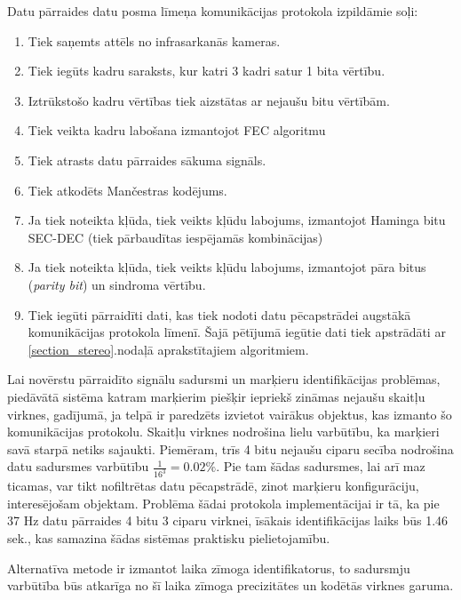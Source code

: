 \documentclass[12pt, a4paper, oneside, openright]{article}
\begin{document}
\par
Datu pārraides datu posma līmeņa komunikācijas protokola izpildāmie soļi:
\begin{enumerate}

\item Tiek saņemts attēls no infrasarkanās kameras.
\item Tiek iegūts kadru saraksts, kur katri 3 kadri satur 1 bita vērtību.
\item Iztrūkstošo kadru vērtības tiek aizstātas ar nejaušu bitu vērtībām.
\item Tiek veikta kadru labošana izmantojot FEC algoritmu
\item Tiek atrasts datu pārraides sākuma signāls.
\item Tiek atkodēts Mančestras kodējums.
\item Ja tiek noteikta kļūda, tiek veikts kļūdu labojums, izmantojot Haminga bitu SEC-DEC (tiek pārbaudītas iespējamās kombinācijas)
\item Ja tiek noteikta kļūda, tiek veikts kļūdu labojums, izmantojot pāra bitus (\textit{parity bit}) un sindroma vērtību.
\item Tiek iegūti pārraidīti dati, kas tiek nodoti datu pēcapstrādei augstākā komunikācijas protokola līmenī. Šajā pētījumā iegūtie dati tiek apstrādāti ar \ref{section_stereo}.nodaļā aprakstītajiem algoritmiem.

\end{enumerate} 

\par
Lai novērstu pārraidīto signālu sadursmi un marķieru identifikācijas problēmas, piedāvātā
sistēma katram marķierim piešķir iepriekš zināmas nejaušu skaitļu virknes, gadījumā, ja
telpā ir paredzēts izvietot vairākus objektus, kas izmanto šo komunikācijas protokolu.
Skaitļu virknes nodrošina lielu varbūtību, ka marķieri savā starpā netiks sajaukti.
Piemēram, trīs 4 bitu nejaušu ciparu secība nodrošina datu sadursmes varbūtību $\frac{1}{16^3} = 0.02\%$.
Pie tam šādas sadursmes, lai arī maz ticamas, var tikt nofiltrētas datu pēcapstrādē,
zinot marķieru konfigurāciju, interesējošam objektam. Problēma šādai protokola implementācijai
ir tā, ka pie 37 Hz datu pārraides 4 bitu 3 ciparu virknei, īsākais identifikācijas laiks būs 1.46 sek.,
kas samazina šādas sistēmas praktisku pielietojamību.

\par
Alternatīva metode ir izmantot laika zīmoga identifikatorus, to sadursmju varbūtība
būs atkarīga no šī laika zīmoga precizitātes un kodētās virknes garuma.
\end{document}
